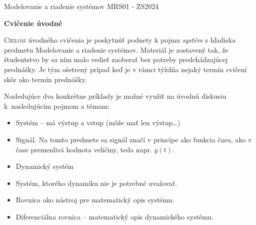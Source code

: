 \documentclass[a4paper, 10pt, ]{article}
\def\oznacenieCasti{MRS01 - ZS2024}
\begin{document}
\lstset{%
style=mystyle,
rangebeginprefix=\#\#\#\ cellB\ ,%
rangebeginsuffix=\ \#\#\#,%
rangeendprefix=\#\#\#\ cellE\ ,%
rangeendsuffix=\ \#\#\#,%
includerangemarker=false,
}






\fontsize{12pt}{22pt}\selectfont

\centerline{\textsf{Modelovanie a riadenie systémov} \hfill \textsf{\oznacenieCasti}}

\fontsize{18pt}{22pt}\selectfont





\begin{flushleft}
	\textbf{\textsf{Cvičenie úvodné}}
\end{flushleft}






\normalsize

\bigskip

{\hypersetup{hidelinks}

\tableofcontents

}

\bigskip

\vspace{18pt}



\noindent
\lettrine[lines=3, nindent=0pt]{C}{ieľom} úvodného cvičenia je poskytnúť podnety k pojmu \emph{systém} z hľadiska predmetu Modelovanie a riadenie systémov. Materiál je zostavený tak, že študentstvo by sa ním malo vedieť zaoberať bez potreby predchádzajúcej prednášky. Je tým ošetrený prípad keď je v rámci týždňa nejaký termín cvičení skôr ako termín prednášky.

\bigskip

\noindent
Nasledujúce dva konkrétne príklady je možné využiť na úvodnú diskusiu k~nasledujúcim pojmom a témam:

\begin{itemize}[leftmargin=0pt, labelsep=1mm, itemsep=-4pt, topsep=0pt, ]
    \item Systém -- má výstup a vstup (môže mať len výstup\ldots)
    \item Signál. Na tomto predmete sa signál značí v princípe ako funkcia času, ako v čase premenlivá hodnota veličiny, teda napr. $y(t)$.
    \item Dynamický systém
    \item Systém, ktorého dynamiku nie je potrebné uvažovať.
    \item Rovnica ako nástroj pre matematický opis systému.
    \item Diferenciálna rovnica -- matematický opis dynamického systému.
\end{itemize}
\end{document}
